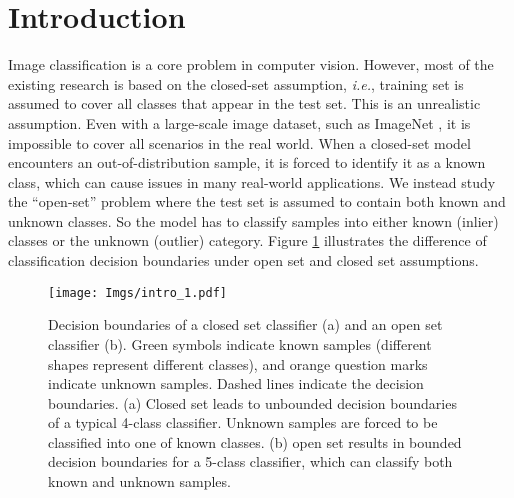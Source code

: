 \documentclass[runningheads]{llncs}
\begin{document}
\section{Introduction}
Image classification is a core problem in computer vision. However, most of the existing research is based on the closed-set assumption, \textit{i.e.}, training set is assumed to cover all classes that appear in the test set. This is an unrealistic assumption. Even with a large-scale image dataset, such as ImageNet \cite{krizhevsky2012imagenet}, it is impossible to cover all scenarios in the real world. When a closed-set model encounters an out-of-distribution sample, it is forced to identify it as a known class, which can cause issues in many real-world applications. We instead study the ``open-set'' problem where the test set is assumed to contain both known and unknown classes. So the model has to classify samples into either known (inlier) classes or the unknown (outlier) category. Figure \ref{pullfigure} illustrates the difference of classification decision boundaries under open set and closed set assumptions.



\begin{figure}[!tb]
\centering
	\texttt{[image: Imgs/intro\_1.pdf]}
 	\caption{Decision boundaries of a closed set classifier (a) and an open set classifier (b). Green symbols indicate known samples (different shapes represent different classes), and orange question marks indicate unknown samples. Dashed lines indicate the decision boundaries. (a) Closed set leads to unbounded decision boundaries of a typical 4-class classifier. Unknown samples are forced to be classified into one of known classes. (b) open set results in bounded decision boundaries for a 5-class classifier, which can classify both known and unknown samples.}
	\label{pullfigure}
\end{figure}
\end{document}
